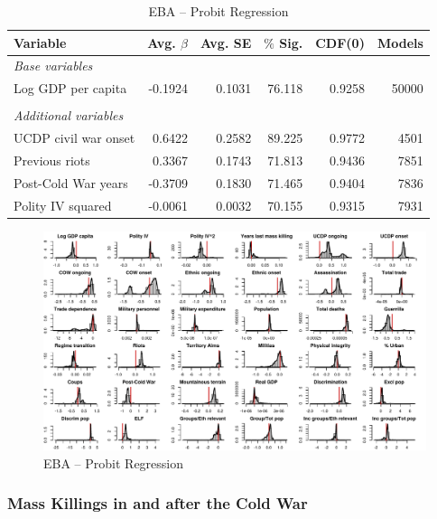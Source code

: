 \begin{table}[H]
\centering
\begin{tabular}{lrrrrr}
\hline
\textbf{Variable} & \textbf{Avg. $\beta$} & \textbf{Avg. SE} & \textbf{$\%$ Sig.} & \textbf{CDF(0)} & \textbf{Models} \\ \hline
\textit{Base variables} &  &  &  &  &  \\
Log GDP per capita & -0.1924 & 0.1031 & 76.118 & 0.9258 & 50000 \\
 &  &  &  &  &  \\
\textit{Additional variables} &  &  &  &  &  \\
UCDP civil war onset & 0.6422 & 0.2582 & 89.225 & 0.9772 & 4501 \\
Previous riots & 0.3367 & 0.1743 & 71.813 & 0.9436 & 7851 \\
Post-Cold War years & -0.3709 & 0.1830 & 71.465 & 0.9404 & 7836 \\
Polity IV squared & -0.0061 & 0.0032 & 70.155 & 0.9315 & 7931 \\ \hline
\end{tabular}
\caption{EBA -- Probit Regression}
\label{tab:eba1}
\end{table}

\clearpage
\begin{figure}
    \centering
    \includegraphics[width=\textwidth]{images/mk-probit.pdf}
    \caption{EBA -- Probit Regression}
    \label{fig:mk-probit}
\end{figure}
\clearpage

\subsubsection{Mass Killings in and after the Cold War}%
\label{sub:mass_killings_in_and_after_the_cold_war}

